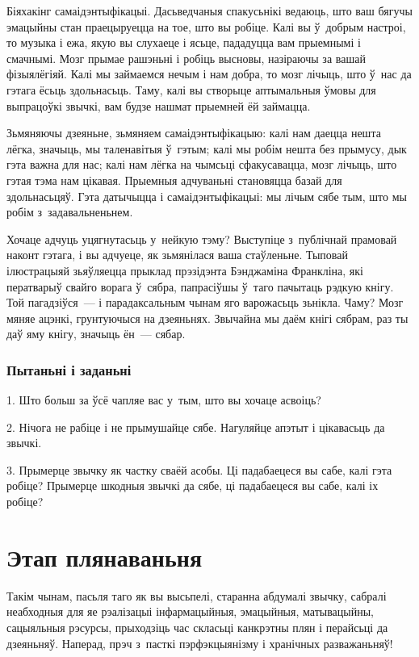Біяхакінг самаідэнтыфікацыі. Дасьведчаныя спакусьнікі ведаюць, што ваш бягучы эмацыйны стан праецыруецца на тое, што вы робіце. Калі вы ў~добрым настроі, то музыка і ежа, якую вы слухаеце і ясьце, пададуцца вам прыемнымі і смачнымі. Мозг прымае рашэньні і робіць высновы, назіраючы за вашай фізыялёгіяй. Калі мы займаемся нечым і нам добра, то мозг лічыць, што ў~нас да гэтага ёсьць здольнасьць. Таму, калі вы створыце аптымальныя ўмовы для выпрацоўкі звычкі, вам будзе нашмат прыемней ёй займацца.

Зьмяняючы дзеяньне, зьмяняем самаідэнтыфікацыю: калі нам даецца нешта лёгка, значыць, мы таленавітыя ў~гэтым; калі мы робім нешта без прымусу, дык гэта важна для нас; калі нам лёгка на чымсьці сфакусавацца, мозг лічыць, што гэтая тэма нам цікавая. Прыемныя адчуваньні становяцца базай для здольнасьцяў. Гэта датычыцца і самаідэнтыфікацыі: мы лічым сябе тым, што мы робім з~задавальненьнем.

Хочаце адчуць уцягнутасьць у~нейкую тэму? Выступіце з~публічнай прамовай наконт гэтага, і вы адчуеце, як зьмянілася ваша стаўленьне. Тыповай ілюстрацыяй зьяўляецца прыклад прэзідэнта Бэнджаміна Франкліна, які ператварыў свайго ворага ў~сябра, папрасіўшы ў~таго пачытаць рэдкую кнігу. Той пагадзіўся~--- і парадаксальным чынам яго варожасьць зьнікла. Чаму? Мозг мяняе ацэнкі, грунтуючыся на дзеяньнях. Звычайна мы даём кнігі сябрам, раз ты даў яму кнігу, значыць ён~--- сябар.

\subsubsection{Пытаньні і заданьні}

1. Што больш за ўсё чапляе вас у~тым, што вы хочаце асвоіць?

2. Нічога не рабіце і не прымушайце сябе. Нагуляйце апэтыт і цікавасьць да звычкі.

3. Прымерце звычку як частку сваёй асобы. Ці падабаецеся вы сабе, калі гэта робіце? Прымерце шкодныя звычкі да сябе, ці падабаецеся вы сабе, калі іх робіце?


\section{Этап плянаваньня}

Такім чынам, пасьля таго як вы высьпелі, старанна абдумалі звычку, сабралі неабходныя для яе рэалізацыі інфармацыйныя, эмацыйныя, матывацыйны, сацыяльныя рэсурсы, прыходзіць час скласьці канкрэтны плян і перайсьці да дзеяньняў. Наперад, прэч з~пасткі пэрфэкцыянізму і хранічных разважаньняў!

